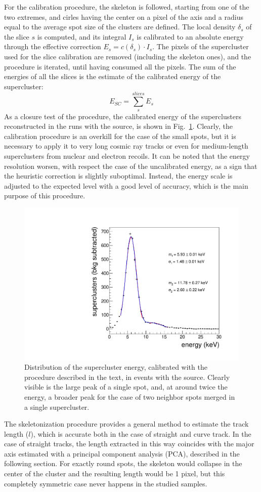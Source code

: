 For the calibration procedure, the skeleton is followed, starting from
one of the two extremes, and cirles having the center on a pixel of
the axis and a radius equal to the average spot size of the \fe
clusters are defined. The local density $\delta_s$ of the slice $s$ is
computed, and its integral $I_s$ is calibrated to an absolute energy
through the effective correction $E_s=c(\delta_s)\cdot I_s$. The
pixels of the supercluster used for the slice calibration are removed
(including the skeleton ones), and the procedure is iterated, until
having consumed all the pixels. The sum of the energies of all the
slices is the estimate of the calibrated energy of the supercluster:
%
\begin{equation}
  \label{eq:ecal}
  E_{SC} = \sum_s^{slices} E_s
\end{equation}
%
As a closure test of the procedure, the calibrated energy of the
superclusters reconstructed in the runs with the \fe source, is shown
in Fig.~\ref{fig:fepeak}.  Clearly, the calibration procedure is an
overkill for the case of the small \fe spots, but it is necessary to
apply it to very long cosmic ray tracks or even for medium-length
superclusters from nuclear and electron recoils. It can be noted that
the energy resolution worsen, with respect the case of the
uncalibrated energy, as a sign that the heuristic correction is
slightly suboptimal. Instead, the energy scale is adjusted to the
expected level with a good level of accuracy, which is the main
purpose of this procedure.
%
\begin{figure}[ht]
  \begin{center}
    \includegraphics[width=0.49\linewidth]{figures/fe_energy_fit}
    \caption{Distribution of the supercluster energy, calibrated with
      the procedure described in the text, in events with the \fe
      source. Clearly visible is the large peak of a single spot, and,
      at around twice the energy, a broader peak for the case of two
      neighbor spots merged in a single supercluster.
      \label{fig:fepeak}}
  \end{center}
\end{figure}
%

The skeletonization procedure provides a general method to estimate
the track length ($l$), which is accurate both in the case of straight
and curve track.  In the case of straight tracks, the length extracted
in this way coincides with the major axis estimated with a principal
component analysis (PCA), described in the following section. For
exactly round spots, the skeleton would collapse in the center of the
cluster and the resulting length would be 1 pixel, but this completely
symmetric case never happens in the studied samples.
